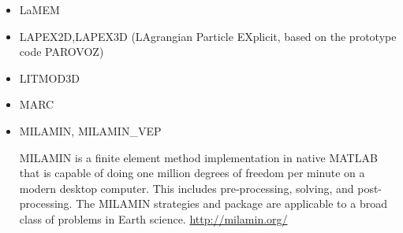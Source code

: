 \begin{itemize}
{\small
\noindent
\cite{facc14}
}

\item LaMEM 

{\small
\noindent
\cite{scbe08}
\cite{kamm10}
\cite{lemk11}
\cite{may12}
\cite{lesh14}\cite{cokm14}\cite{bakp14}\cite{feka14a}\cite{feka14b}
\cite{puka15}\cite{feka15}\cite{cofk15}
\cite{kapb16}\cite{coyc16}
\cite{pukp18}
\cite{eitp19}
}

\item LAPEX2D,LAPEX3D  (LAgrangian Particle EXplicit, based on the prototype code PAROVOZ) 

{\small
\noindent
\cite{sopg05}\cite{baso05}\cite{soba05}
\cite{bbeg06}\cite{basv06}
\cite{peso06}\cite{peso08}
\cite{baso08}
\cite{scbe08}
\cite{sosk11}
}

\item LITMOD3D

{\small 
\noindent
\cite{afrf07}
\cite{affr08}
\cite{fuac09}
\cite{fufa10}
}

\item MARC

{\small
\noindent
\cite{nesg97}
\cite{nesb99}
}


\item {\codefont MILAMIN, MILAMIN\_VEP} 

MILAMIN is a finite element method implementation in native MATLAB that is capable of doing one million degrees of freedom per minute on a modern desktop computer. This includes pre-processing, solving, and post-processing. The MILAMIN strategies and package are applicable to a broad class of problems in Earth science. \url{http://milamin.org/}


\end{itemize}
